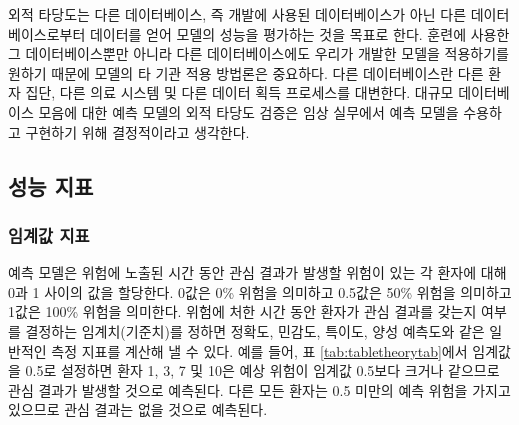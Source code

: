 \documentclass[10.5pt]{book}
\theoremstyle{definition}
\theoremstyle{definition}
\theoremstyle{definition}
\theoremstyle{remark}
\begin{document}
외적 타당도는 다른 데이터베이스, 즉 개발에 사용된 데이터베이스가 아닌
다른 데이터베이스로부터 데이터를 얻어 모델의 성능을 평가하는 것을 목표로
한다. 훈련에 사용한 그 데이터베이스뿐만 아니라 다른 데이터베이스에도
우리가 개발한 모델을 적용하기를 원하기 때문에 모델의 타 기관 적용
방법론은 중요하다. 다른 데이터베이스란 다른 환자 집단, 다른 의료 시스템
및 다른 데이터 획득 프로세스를 대변한다. 대규모 데이터베이스 모음에 대한
예측 모델의 외적 타당도 검증은 임상 실무에서 예측 모델을 수용하고
구현하기 위해 결정적이라고 생각한다.

\subsection{성능 지표}\label{performance}

\subsubsection*{임계값 지표}\label{-}

예측 모델은 위험에 노출된 시간 동안 관심 결과가 발생할 위험이 있는 각
환자에 대해 0과 1 사이의 값을 할당한다. 0값은 0\% 위험을 의미하고
0.5값은 50\% 위험을 의미하고 1값은 100\% 위험을 의미한다. 위험에 처한
시간 동안 환자가 관심 결과를 갖는지 여부를 결정하는 임계치(기준치)를
정하면 정확도, 민감도, 특이도, 양성 예측도와 같은 일반적인 측정 지표를
계산해 낼 수 있다. 예를 들어, 표 \ref{tab:tabletheorytab}에서 임계값을
0.5로 설정하면 환자 1, 3, 7 및 10은 예상 위험이 임계값 0.5보다 크거나
같으므로 관심 결과가 발생할 것으로 예측된다. 다른 모든 환자는 0.5 미만의
예측 위험을 가지고 있으므로 관심 결과는 없을 것으로 예측된다.
  
 
\end{document}
